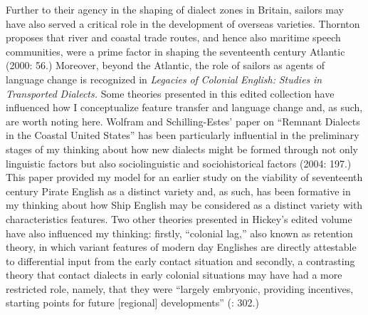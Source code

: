   Further to their agency in the shaping of dialect zones in Britain, sailors may have also served a critical role in the development of overseas varieties. Thornton proposes that river and coastal trade routes, and hence also maritime speech communities, were a prime factor in shaping the seventeenth century Atlantic (2000: 56.) Moreover, beyond the Atlantic, the role of sailors as agents of language change is recognized in  \textit{Legacies} \textit{of} \textit{Colonial} \textit{English:} \textit{Studies} \textit{in} \textit{Transported} \textit{Dialects.} Some theories presented in this edited collection have influenced how I conceptualize feature transfer and language change and, as such, are worth noting here. Wolfram and Schilling-Estes’ paper on “Remnant Dialects in the Coastal United States” has been particularly influential in the preliminary stages of my thinking about how new dialects might be formed through not only linguistic factors but also sociolinguistic and sociohistorical factors (2004: 197.) This paper provided my model for an earlier study on the viability of seventeenth century Pirate English as a distinct variety \citep{Delgado2013} and, as such, has been formative in my thinking about how Ship English may be considered as a distinct variety with characteristics features. Two other theories presented in Hickey’s edited volume have also influenced my thinking: firstly, “colonial lag,” also known as retention theory, in which variant features of modern day Englishes are directly attestable to differential input from the early contact situation \citep[8,]{Hickey2004} and secondly, a contrasting theory that contact dialects in early colonial situations may have had a more restricted role, namely, that they were “largely embryonic, providing incentives, starting points for future [regional] developments” (\citealt{Schneider2004}: 302.) 

